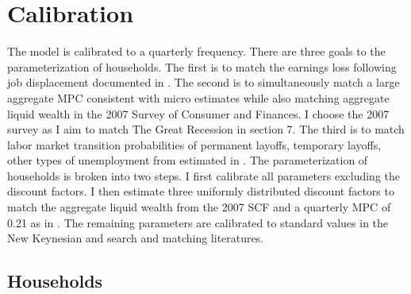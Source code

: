 
\section{Calibration}


The model is calibrated to a quarterly frequency. There are three goals to the parameterization of households. The first is to match the earnings loss following job displacement documented in \cite{DavisVonWachter2011}. The second is to simultaneously match a large aggregate MPC consistent with micro estimates while also matching aggregate liquid wealth in the 2007 Survey of Consumer and Finances. I choose the 2007 survey as I aim to match The Great Recession in section 7. The third is to match labor market transition probabilities of permanent layoffs, temporary layoffs, other types of unemployment from estimated in \cite{Gertler2022}. The parameterization of households is broken into two steps. I first calibrate all parameters excluding the discount factors. I then estimate three uniformly distributed discount factors to match the aggregate liquid wealth from the 2007 SCF and a quarterly MPC of 0.21 as in \cite{kekre2023}. The remaining parameters are calibrated to standard values in the New Keynesian and search and matching literatures. 
 

\hypertarget{Households}{}
\subsection{Households }


